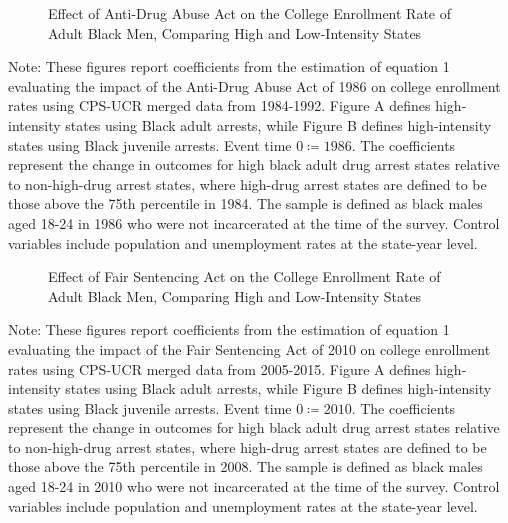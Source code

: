 \clearpage 

\begin{figure}[h]
  \centering
  \caption{Effect of Anti-Drug Abuse Act on the College Enrollment Rate of Adult Black Men, Comparing High and Low-Intensity States}%
  \qquad
  \label{fig:rs_es_1986}%
\end{figure}

\begin{footnotesize}
  \noindent Note: These figures report coefficients from the estimation of equation 1 evaluating the impact of the Anti-Drug Abuse Act of 1986 on college enrollment rates using CPS-UCR merged data from 1984-1992. Figure A defines high-intensity states using Black adult arrests, while Figure B defines high-intensity states using Black juvenile arrests. Event time $0 \coloneqq 1986$. The coefficients represent the change in outcomes for high black adult drug arrest states relative to non-high-drug arrest states, where high-drug arrest states are defined to be those above the 75th percentile in 1984. The sample is defined as black males aged 18-24 in 1986 who were not incarcerated at the time of the survey. Control variables include population and unemployment rates at the state-year level. 
\end{footnotesize}

\clearpage

\begin{figure}[h]
  \centering
  \caption{Effect of Fair Sentencing Act on the College Enrollment Rate of Adult Black Men, Comparing High and Low-Intensity States}%
  \qquad
  \label{fig:rf_jb_es_2010}%
\end{figure}

\begin{footnotesize}
  \noindent Note: These figures report coefficients from the estimation of equation 1 evaluating the impact of the Fair Sentencing Act of 2010 on college enrollment rates using CPS-UCR merged data from 2005-2015. Figure A defines high-intensity states using Black adult arrests, while Figure B defines high-intensity states using Black juvenile arrests. Event time $0 \coloneqq 2010$. The coefficients represent the change in outcomes for high black adult drug arrest states relative to non-high-drug arrest states, where high-drug arrest states are defined to be those above the 75th percentile in 2008. The sample is defined as black males aged 18-24 in 2010 who were not incarcerated at the time of the survey. Control variables include population and unemployment rates at the state-year level. 
\end{footnotesize}

\clearpage
